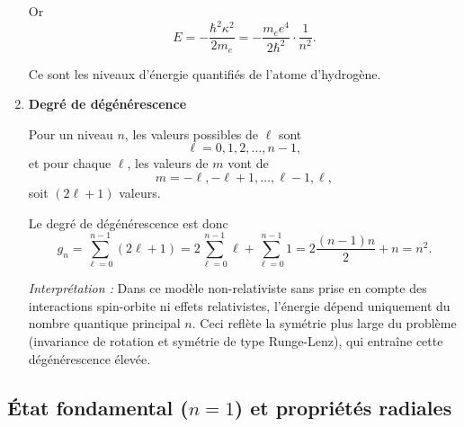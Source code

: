 \documentclass[a4paper,10pt]{report}
\begin{document}
\begin{enumerate}
		Or
		\[
		E = - \frac{\hbar^2 \kappa^2}{2 m_e} = - \frac{m_e e^4}{2 \hbar^2} \cdot \frac{1}{n^2}.
		\]
		
		Ce sont les niveaux d’énergie quantifiés de l’atome d’hydrogène.
		
		\item \textbf{Degré de dégénérescence}
		
		Pour un niveau $n$, les valeurs possibles de $\ell$ sont
		\[
		\ell = 0, 1, 2, \ldots, n-1,
		\]
		et pour chaque $\ell$, les valeurs de $m$ vont de
		\[
		m = -\ell, -\ell+1, \ldots, \ell-1, \ell,
		\]
		soit $(2\ell + 1)$ valeurs.
		
		Le degré de dégénérescence est donc
		\[
		g_n = \sum_{\ell=0}^{n-1} (2\ell + 1) = 2 \sum_{\ell=0}^{n-1} \ell + \sum_{\ell=0}^{n-1} 1 = 2 \frac{(n-1)n}{2} + n = n^2.
		\]
		
		\textit{Interprétation :} Dans ce modèle non-relativiste sans prise en compte des interactions spin-orbite ni effets relativistes, l'énergie dépend uniquement du nombre quantique principal $n$. Ceci reflète la symétrie plus large du problème (invariance de rotation et symétrie de type Runge-Lenz), qui entraîne cette dégénérescence élevée.
		
	\end{enumerate}
	
	\subsection{État fondamental ($n=1$) et propri\'et\'es radiales}
	
\end{document}
